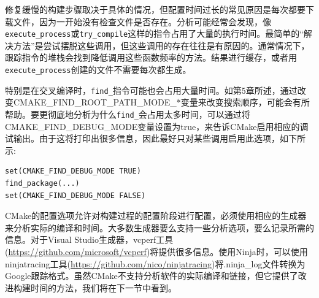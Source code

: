 修复缓慢的构建步骤取决于具体的情况，但配置时间过长的常见原因是每次都要下载文件，因为一开始没有检查文件是否存在。分析可能经常会发现，像\texttt{execute\_process}或\texttt{try\_compile}这样的指令占用了大量的执行时间。最简单的“解决方法”是尝试摆脱这些调用，但这些调用的存在往往是有原因的。通常情况下，跟踪指令的堆栈会找到降低调用这些函数频率的方法。结果进行缓存，或者用\texttt{execute\_process}创建的文件不需要每次都生成。

特别是在交叉编译时，\texttt{find\_}指令可能也会占用大量时间。如第5章所述，通过改变CMAKE\_FIND\_ROOT\_PATH\_MODE\_*变量来改变搜索顺序，可能会有所帮助。要更彻底地分析为什么\texttt{find\_}会占用太多时间，可以通过将CMAKE\_FIND\_DEBUG\_MODE变量设置为true，来告诉CMake启用相应的调试输出。由于这将打印出很多信息，因此最好只对某些调用启用此选项，如下所示:

\begin{lstlisting}[style=styleCMake]
set(CMAKE_FIND_DEBUG_MODE TRUE)
find_package(...)
set(CMAKE_FIND_DEBUG_MODE FALSE)
\end{lstlisting}

CMake的配置选项允许对构建过程的配置阶段进行配置，必须使用相应的生成器来分析实际的编译和时间。大多数生成器要么支持一些分析选项，要么记录所需的信息。对于Visual Studio生成器，vcperf工具(\url{https://github.com/microsoft/vcperf})将提供很多信息。使用Ninja时，可以使用ninjatracing工具(\url{https://github.com/nico/ninjatracing})将.ninja\_log文件转换为Google跟踪格式。虽然CMake不支持分析软件的实际编译和链接，但它提供了改进构建时间的方法，我们将在下一节中看到。































